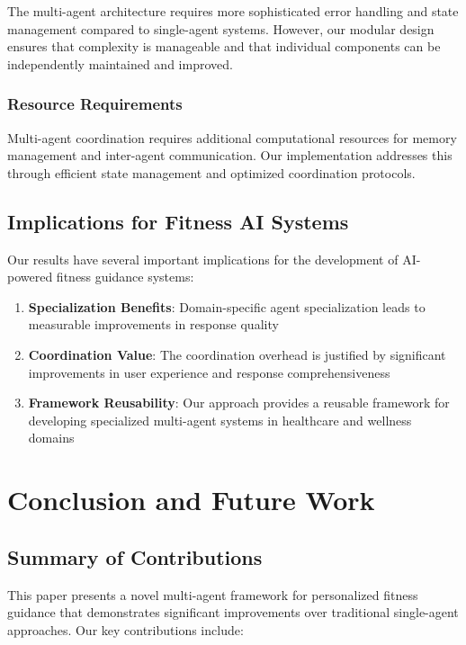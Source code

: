\documentclass[conference]{IEEEtran}
\begin{document}
The multi-agent architecture requires more sophisticated error handling and state management compared to single-agent systems. However, our modular design ensures that complexity is manageable and that individual components can be independently maintained and improved.

\subsubsection{Resource Requirements}

Multi-agent coordination requires additional computational resources for memory management and inter-agent communication. Our implementation addresses this through efficient state management and optimized coordination protocols.

\subsection{Implications for Fitness AI Systems}

Our results have several important implications for the development of AI-powered fitness guidance systems:

\begin{enumerate}
\item \textbf{Specialization Benefits}: Domain-specific agent specialization leads to measurable improvements in response quality
\item \textbf{Coordination Value}: The coordination overhead is justified by significant improvements in user experience and response comprehensiveness
\item \textbf{Framework Reusability}: Our approach provides a reusable framework for developing specialized multi-agent systems in healthcare and wellness domains
\end{enumerate}

\section{Conclusion and Future Work}

\subsection{Summary of Contributions}

This paper presents a novel multi-agent framework for personalized fitness guidance that demonstrates significant improvements over traditional single-agent approaches. Our key contributions include:
\end{document}

